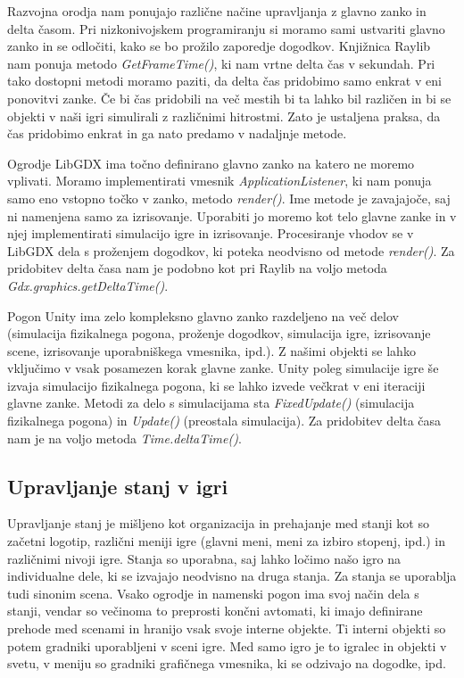 \documentclass[12pt,a4paper,twoside]{book}
\begin{document}
Razvojna orodja nam ponujajo različne načine upravljanja z glavno zanko in delta časom. Pri nizkonivojskem programiranju si moramo sami ustvariti glavno zanko in se odločiti, kako se bo prožilo zaporedje dogodkov. Knjižnica Raylib nam ponuja metodo \textit{GetFrameTime()}, ki nam vrtne delta čas v sekundah. Pri tako dostopni metodi moramo paziti, da delta čas pridobimo samo enkrat v eni ponovitvi zanke. Če bi čas pridobili na več mestih bi ta lahko bil različen in bi se objekti v naši igri simulirali z različnimi hitrostmi. Zato je ustaljena praksa, da čas pridobimo enkrat in ga nato predamo v nadaljnje metode.

Ogrodje LibGDX ima točno definirano glavno zanko na katero ne moremo vplivati. Moramo implementirati vmesnik \textit{ApplicationListener}, ki nam ponuja samo eno vstopno točko v zanko, metodo \textit{render()}. Ime metode je zavajajoče, saj ni namenjena samo za izrisovanje. Uporabiti jo moremo kot telo glavne zanke in v njej implementirati simulacijo igre in izrisovanje. Procesiranje vhodov se v LibGDX dela s proženjem dogodkov, ki poteka neodvisno od metode \textit{render()}. Za pridobitev delta časa nam je podobno kot pri Raylib na voljo metoda \textit{Gdx.graphics.getDeltaTime()}.

Pogon Unity ima zelo kompleksno glavno zanko razdeljeno na več delov (simulacija fizikalnega pogona, proženje dogodkov, simulacija igre, izrisovanje scene, izrisovanje uporabniškega vmesnika, ipd.). Z našimi objekti se lahko vključimo v vsak posamezen korak glavne zanke. Unity poleg simulacije igre še izvaja simulacijo fizikalnega pogona, ki se lahko izvede večkrat v eni iteraciji glavne zanke. Metodi za delo s simulacijama sta \textit{FixedUpdate()} (simulacija fizikalnega pogona) in \textit{Update()} (preostala simulacija). Za pridobitev delta časa nam je na voljo metoda \textit{Time.deltaTime()}.

\subsection{Upravljanje stanj v igri}
Upravljanje stanj je mišljeno kot organizacija in prehajanje med stanji kot so začetni logotip, različni meniji igre (glavni meni, meni za izbiro stopenj, ipd.) in različnimi nivoji igre. Stanja so uporabna, saj lahko ločimo našo igro na individualne dele, ki se izvajajo neodvisno na druga stanja. Za stanja se uporablja tudi sinonim scena. Vsako ogrodje in namenski pogon ima svoj način dela s stanji, vendar so večinoma to preprosti končni avtomati, ki imajo definirane prehode med scenami in hranijo vsak svoje interne objekte. Ti interni objekti so potem gradniki uporabljeni v sceni igre. Med samo igro je to igralec in objekti v svetu, v meniju so gradniki grafičnega vmesnika, ki se odzivajo na dogodke, ipd.
\end{document}

